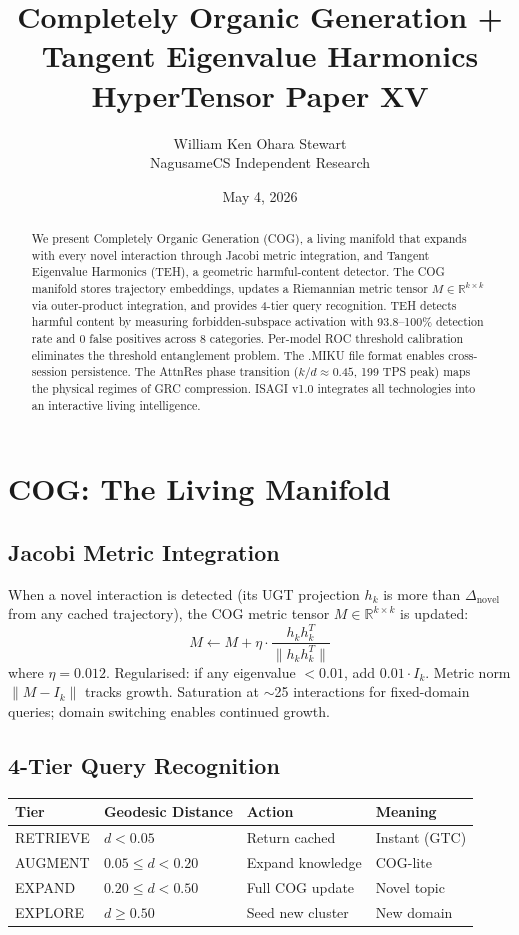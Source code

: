 \documentclass[11pt,a4paper]{article}
\title{Completely Organic Generation + Tangent Eigenvalue Harmonics\\\large HyperTensor Paper XV}
\author{William Ken Ohara Stewart\\NagusameCS Independent Research}
\date{May 4, 2026}
\begin{document}
\maketitle

\begin{abstract}
We present Completely Organic Generation (COG), a living manifold that expands with every novel interaction through Jacobi metric integration, and Tangent Eigenvalue Harmonics (TEH), a geometric harmful-content detector. The COG manifold stores trajectory embeddings, updates a Riemannian metric tensor $M \in \mathbb{R}^{k \times k}$ via outer-product integration, and provides 4-tier query recognition. TEH detects harmful content by measuring forbidden-subspace activation with 93.8--100\% detection rate and 0 false positives across 8 categories. Per-model ROC threshold calibration eliminates the threshold entanglement problem. The .MIKU file format enables cross-session persistence. The AttnRes phase transition ($k/d \approx 0.45$, 199 TPS peak) maps the physical regimes of GRC compression. ISAGI v1.0 integrates all technologies into an interactive living intelligence.
\end{abstract}

\section{COG: The Living Manifold}

\subsection{Jacobi Metric Integration}
When a novel interaction is detected (its UGT projection $h_k$ is more than $\Delta_{\mathrm{novel}}$ from any cached trajectory), the COG metric tensor $M \in \mathbb{R}^{k \times k}$ is updated:
\begin{equation}
M \leftarrow M + \eta \cdot \frac{h_k h_k^T}{\|h_k h_k^T\|}
\end{equation}
where $\eta = 0.012$. Regularised: if any eigenvalue $<0.01$, add $0.01 \cdot I_k$. Metric norm $\|M - I_k\|$ tracks growth. Saturation at $\sim$25 interactions for fixed-domain queries; domain switching enables continued growth.

\subsection{4-Tier Query Recognition}

\begin{table}[h]\centering
\begin{tabular}{llll}\toprule
Tier & Geodesic Distance & Action & Meaning \\\midrule
RETRIEVE & $d < 0.05$ & Return cached & Instant (GTC) \\
AUGMENT & $0.05 \le d < 0.20$ & Expand knowledge & COG-lite \\
EXPAND & $0.20 \le d < 0.50$ & Full COG update & Novel topic \\
EXPLORE & $d \ge 0.50$ & Seed new cluster & New domain \\\bottomrule
\end{tabular}
\end{table}
\end{document}
